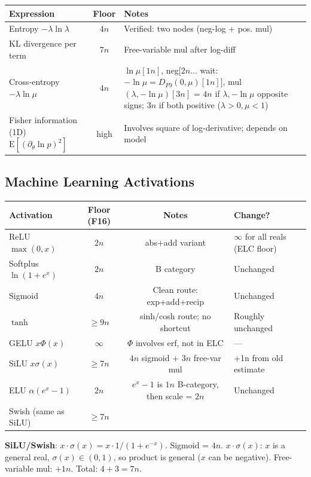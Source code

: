\documentclass[11pt]{article}
\newcommand{\ok}[1]{\textcolor{ok}{#1}}
\newcommand{\flag}[1]{\textcolor{flag}{#1}}
\begin{document}
\begin{center}
\begin{tabular}{lcp{5cm}}
\toprule
Expression & Floor & Notes \\
\midrule
Entropy $-\lambda\ln\lambda$ & $4n$ & Verified: two nodes (neg-log + pos. mul) \\
KL divergence per term & $7n$ & Free-variable mul after log-diff \\
Cross-entropy $-\lambda\ln\mu$ & $4n$ & $\ln\mu[1n]$, neg[$2n$... wait: $-\ln\mu = D_{F9}(0,\mu)[1n]$], mul$(\lambda, -\ln\mu)[3n]$ = $4n$ if $\lambda,-\ln\mu$ opposite signs; $3n$ if both positive ($\lambda>0, \mu<1$) \\
Fisher information (1D) $\mathrm{E}[(\partial_\theta\ln p)^2]$ & high & Involves square of log-derivative; depends on model \\
\bottomrule
\end{tabular}
\end{center}

\subsection{Machine Learning Activations}

\begin{center}
\begin{tabular}{lccp{4cm}}
\toprule
Activation & Floor (F16) & Notes & Change? \\
\midrule
ReLU $\max(0,x)$ & $2n$ & abs+add variant & $\infty$ for all reals (ELC floor) \\
Softplus $\ln(1+e^x)$ & $2n$ & B category & \ok{Unchanged} \\
Sigmoid & $4n$ & Clean route: exp+add+recip & \ok{Unchanged} \\
$\tanh$ & $\geq 9n$ & sinh/cosh route; no shortcut & Roughly unchanged \\
GELU $x\Phi(x)$ & $\infty$ & $\Phi$ involves erf, not in ELC & --- \\
SiLU $x\sigma(x)$ & $\geq 7n$ & $4n$ sigmoid + $3n$ free-var mul & \flag{+1n from old estimate} \\
ELU $\alpha(e^x-1)$ & $2n$ & $e^x-1$ is $1n$ B-category, then scale = $2n$ & \ok{Unchanged} \\
Swish (same as SiLU) & $\geq 7n$ & & \\
\bottomrule
\end{tabular}
\end{center}

\noindent\textbf{SiLU/Swish}: $x \cdot \sigma(x) = x \cdot 1/(1+e^{-x})$.
Sigmoid = $4n$. $x \cdot \sigma(x)$: $x$ is a general real, $\sigma(x) \in (0,1)$, so product is general ($x$ can be negative). Free-variable mul: $+1n$. Total: $4+3 = 7n$.
\end{document}
